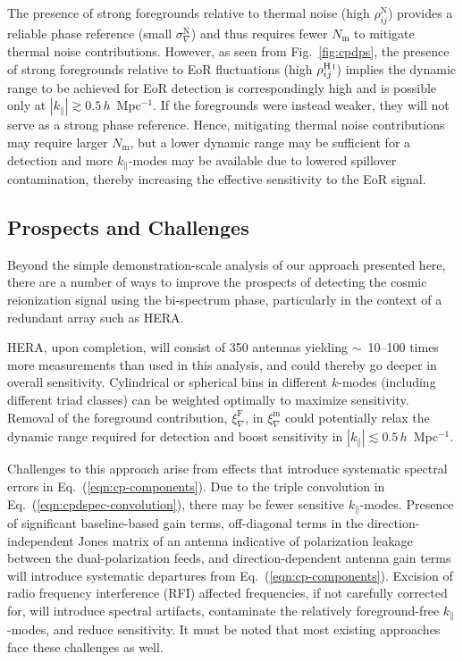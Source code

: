 \documentclass[
reprint,
superscriptaddress,
amsmath,
amssymb,
aps,
prd
]{revtex4-1}
\newcommand{\HI}{H\,{\sc i}}
\begin{document}
The presence of strong foregrounds relative to thermal noise (high $\rho_{ij}^\textrm{N}$) provides a reliable phase reference (small $\sigma_\nabla^\textrm{N}$) and thus requires fewer $N_\textrm{m}$ to mitigate thermal noise contributions. However, as seen from Fig.~\ref{fig:cpdps}, the presence of strong foregrounds relative to EoR fluctuations (high $\rho_{ij}^\textrm{\HI}$) implies the dynamic range to be achieved for EoR detection is correspondingly high and is possible only at $|k_\parallel| \gtrsim 0.5\,h$~Mpc$^{-1}$. If the foregrounds were instead weaker, they will not serve as a strong phase reference. Hence, mitigating thermal noise contributions may require larger $N_\textrm{m}$, but a lower dynamic range may be sufficient for a detection and more $k_\parallel$-modes may be available due to lowered spillover contamination, thereby increasing the effective sensitivity to the EoR signal. 

\subsection{Prospects and Challenges}\label{sec:prospects-challenges}

Beyond the simple demonstration-scale analysis of our approach presented here, there are a number of ways to improve the prospects of detecting the cosmic reionization signal using the bi-spectrum phase, particularly in the context of a redundant array such as HERA. 

HERA, upon completion, will consist of 350 antennas yielding $\sim$~10--100 times more measurements than used in this analysis, and could thereby go deeper in overall sensitivity. Cylindrical or spherical bins in different $k$-modes (including different triad classes) can be weighted optimally \cite{liu14a,liu14b,dil15} to maximize sensitivity. Removal of the foreground contribution, $\xi_\nabla^\textrm{F}$, in $\xi_\nabla^\textrm{m}$ could potentially relax the dynamic range required for detection and boost sensitivity in $|k_\parallel| \lesssim 0.5\,h$~Mpc$^{-1}$.

Challenges to this approach arise from effects that introduce systematic spectral errors in Eq.~(\ref{eqn:cp-components}). Due to the triple convolution in Eq.~(\ref{eqn:cpdspec-convolution}), there may be  fewer sensitive $k_\parallel$-modes. Presence of significant baseline-based gain terms, off-diagonal terms in the direction-independent Jones matrix of an antenna indicative of polarization leakage between the dual-polarization feeds, and direction-dependent antenna gain terms will introduce systematic departures from Eq.~(\ref{eqn:cp-components}). Excision of radio frequency interference (RFI) affected frequencies, if not carefully corrected for, will introduce spectral artifacts, contaminate the relatively foreground-free $k_\parallel$-modes, and reduce sensitivity. It must be noted that most existing approaches face these challenges as well.
\end{document}
